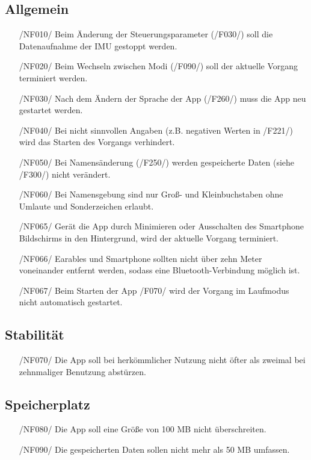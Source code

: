 \documentclass[a4paper,12pt]{article}
\begin{document}
\subsection{Allgemein}
\begin{itemize}
  \item[/NF010/] Beim Änderung der \Gls{Steuerungsparameter} (/F030/) soll die Datenaufnahme der \Gls{IMU} gestoppt werden.
  \item[/NF020/] Beim Wechseln zwischen Modi (/F090/) soll der aktuelle Vorgang terminiert werden.
  \item[/NF030/] Nach dem Ändern der Sprache der App (/F260/) muss die App neu gestartet werden.
  \item[/NF040/] Bei nicht sinnvollen Angaben (z.B. negativen Werten in /F221/) wird das Starten des Vorgangs verhindert.
  \item[/NF050/] Bei Namensänderung (/F250/) werden gespeicherte Daten (siehe /F300/) nicht verändert.
  \item[/NF060/] Bei Namensgebung sind nur Groß- und Kleinbuchstaben ohne Umlaute und Sonderzeichen erlaubt.
  \item[/NF065/] Gerät die App durch Minimieren oder Ausschalten des Smartphone Bildschirms in den Hintergrund, wird der aktuelle Vorgang terminiert.
  \item[/NF066/] Earables und Smartphone sollten nicht über zehn Meter voneinander entfernt werden, sodass eine Bluetooth-Verbindung möglich ist. 
  \item[/NF067/] Beim Starten der App /F070/ wird der Vorgang im Laufmodus nicht automatisch gestartet.
\end{itemize}
\subsection{Stabilität}
\begin{itemize}
  \item[/NF070/] Die App soll bei herkömmlicher Nutzung nicht öfter als zweimal bei zehnmaliger Benutzung abstürzen. 
\end{itemize}
\subsection{Speicherplatz}
\begin{itemize}
  \item[/NF080/] Die App soll eine Größe von 100 MB nicht überschreiten. 
  \item[/NF090/] Die gespeicherten Daten sollen nicht mehr als 50 MB umfassen. 
\end{itemize}
\end{document}
